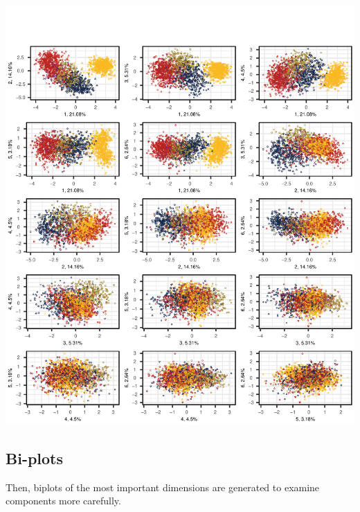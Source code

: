 \documentclass[
  letterpaper,
  DIV=11,
  numbers=noendperiod]{scrreprt}
\begin{document}
\includegraphics{E_Ch6_Analysis_files/figure-pdf/PCAtools-pairsplots-TxB-1.pdf}

\subsection{Bi-plots}\label{bi-plots}

Then, biplots of the most important dimensions are generated to examine
components more carefully.
\end{document}
